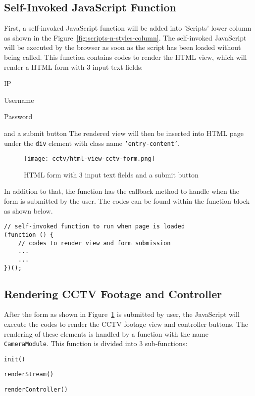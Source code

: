 \subsection*{Self-Invoked JavaScript Function}
First, a self-invoked JavaScript function will be added into 'Scripts' lower column as shown in the Figure~\ref{fig:scripts-n-styles-column}. The self-invoked JavaScript will be executed by the browser as soon as the script has been loaded without being called. This function contains codes to render the HTML view, which will render a HTML form with 3 input text fields:
\begin{itemize*}
\item IP
\item Username
\item Password
\end{itemize*}
and a submit button The rendered view will then be inserted into HTML page under the \texttt{div} element with class name \texttt{'entry-content'}.

\begin{figure}[ht]
\caption{HTML form with 3 input text fields and a submit button}
\label{fig:html-view-cctv-form}
\centering
\texttt{[image: cctv/html-view-cctv-form.png]}
\end{figure}

In addition to that, the function has the callback method to handle when the form is submitted by the user. The codes can be found within the function block as shown below.
\begin{lstlisting}
// self-invoked function to run when page is loaded
(function () {
	// codes to render view and form submission
	...
	...
})();
\end{lstlisting}

\subsection*{Rendering CCTV Footage and Controller} \label{sec:cctv-rendering-camera-module}
After the form as shown in Figure~\ref{fig:html-view-cctv-form} is submitted by user, the JavaScript will execute the codes to render the CCTV footage view and controller buttons. The rendering of these elements is handled by a function with the name \texttt{CameraModule}. This function is divided into 3 sub-functions:
\begin{itemize*}
\item \texttt{init()}
\item \texttt{renderStream()}
\item \texttt{renderController()}
\end{itemize*}

